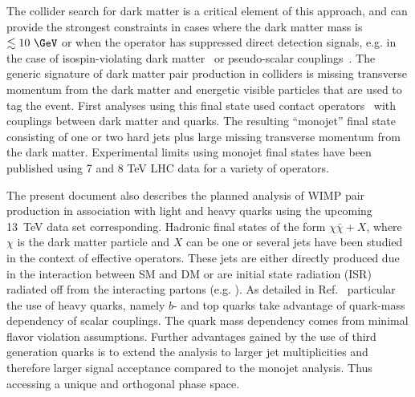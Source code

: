 The collider search for dark matter is a critical element of this
approach, and can provide the strongest constraints in cases where the
dark matter mass is $\lesssim 10\ \GeV$ or when the operator has
suppressed direct detection signals, e.g. in the case of
isospin-violating dark matter~\cite{Feng:2011vu} or pseudo-scalar
couplings~\cite{Buckley:2014fba}. The generic signature of dark matter
pair production in colliders is missing transverse momentum from the
dark matter and energetic visible particles that are used to tag the
event. First analyses using this final state used contact
operators~\cite{Goodman:2010ku} with couplings between dark matter and
quarks. The resulting ``monojet'' final state consisting of one or two
hard jets plus large missing transverse momentum from the dark matter.
Experimental limits using monojet final states have been published using
7 and 8 TeV LHC data \cite{Chatrchyan:2012me,ATLAS:2012ky} for a variety
of operators.




The present document also describes the planned analysis of WIMP pair production in association with light and heavy quarks using the upcoming 13~TeV data set corresponding. 
Hadronic final states of the form $\chi \bar \chi + X$, where $\chi$ is the dark matter particle and $X$ can be one or several jets have been studied in the context of effective operators. These jets are either directly produced due in the interaction between SM and DM or are initial state radiation (ISR)  radiated off from the interacting partons (e.g. \cite{Goodman:2010yf,Fox:2011pm,Petriello:2008pu,Fox:2011fx}). As detailed in Ref.~\cite{Lin:2013sca, Artoni:2013zba} particular the use of heavy quarks, namely $b$- and top quarks take advantage of quark-mass dependency of scalar couplings. The quark mass dependency comes from minimal flavor violation assumptions. Further advantages gained by the use of third generation quarks is to extend the analysis to larger jet multiplicities and therefore larger signal acceptance compared to the monojet analysis. Thus accessing a unique and orthogonal phase space. 


